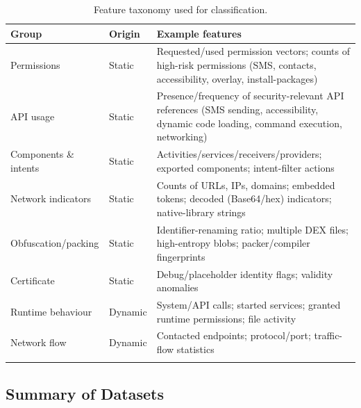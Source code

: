 \documentclass[11pt,a4paper]{article}
\begin{document}
\begin{longtable}{p{3.0cm} p{2.4cm} p{8.0cm}}
\toprule
\textbf{Group} & \textbf{Origin} & \textbf{Example features}\\
\midrule
\endhead
Permissions & Static & Requested/used permission vectors; counts of high-risk permissions (SMS, contacts, accessibility, overlay, install-packages)\\
API usage & Static & Presence/frequency of security-relevant API references (SMS sending, accessibility, dynamic code loading, command execution, networking)\\
Components \& intents & Static & Activities/services/receivers/providers; exported components; intent-filter actions\\
Network indicators & Static & Counts of URLs, IPs, domains; embedded tokens; decoded (Base64/hex) indicators; native-library strings\\
Obfuscation/packing & Static & Identifier-renaming ratio; multiple DEX files; high-entropy blobs; packer/compiler fingerprints\\
Certificate & Static & Debug/placeholder identity flags; validity anomalies\\
Runtime behaviour & Dynamic & System/API calls; started services; granted runtime permissions; file activity\\
Network flow & Dynamic & Contacted endpoints; protocol/port; traffic-flow statistics\\
\bottomrule
\caption{Feature taxonomy used for classification.}
\label{tab:features}
\end{longtable}

\subsection{Summary of Datasets}

\end{document}
